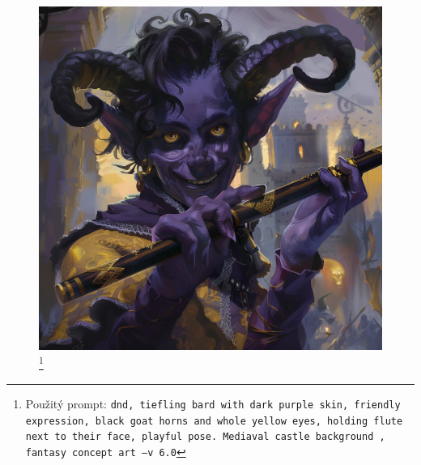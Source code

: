 \begin{figure}[h]
  \begin{minipage}{\textwidth}
    \centering
    \includegraphics[width=\textwidth]{resources/figures/demonkin-bard.png}
    \caption[Demonkin Bard -~jedna z~hratelných postav]{\footnote[5]{Použitý prompt: \texttt{dnd, tiefling bard with dark purple skin, friendly expression, black goat horns and whole yellow eyes, holding flute next to their face, playful pose. Mediaval castle background , fantasy concept art --v 6.0}}}
    \label{fig:demonkin-bard}
  \end{minipage}
\end{figure}